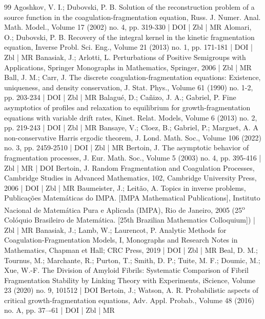 \documentclass[10pt]{amsart}
\theoremstyle{definition}\newtheorem{defi}[theo]{Definition}\newtheorem{rema}[theo]{Remark}\newtheorem{exam}[theo]{Example}\newtheorem{exem}[theo]{Example}\newtheorem{nota}[theo]{Notation}
\begin{document}
\begin{thebibliography}{99}
Agoshkov, V. I.; Dubovski, P. B. Solution of the reconstruction problem of a source function in the coagulation-fragmentation equation, Russ. J. Numer. Anal. Math. Model., Volume 17 (2002) no. 4, pp. 319-330 | DOI | Zbl | MR
Alomari, O.; Dubovski, P. B. Recovery of the integral kernel in the kinetic fragmentation equation, Inverse Probl. Sci. Eng., Volume 21 (2013) no. 1, pp. 171-181 | DOI | Zbl | MR
Banasiak, J.; Arlotti, L. Perturbations of Positive Semigroups with Applications, Springer Monographs in Mathematics, Springer, 2006 | Zbl | MR
Ball, J. M.; Carr, J. The discrete coagulation-fragmentation equations: Existence, uniqueness, and density conservation, J. Stat. Phys., Volume 61 (1990) no. 1-2, pp. 203-234 | DOI | Zbl | MR
Balagué, D.; Cañizo, J. A.; Gabriel, P. Fine asymptotics of profiles and relaxation to equilibrium for growth-fragmentation equations with variable drift rates, Kinet. Relat. Models, Volume 6 (2013) no. 2, pp. 219-243 | DOI | Zbl | MR
Bansaye, V.; Cloez, B.; Gabriel, P.; Marguet, A. A non-conservative Harris ergodic theorem, J. Lond. Math. Soc., Volume 106 (2022) no. 3, pp. 2459-2510 | DOI | Zbl | MR
Bertoin, J. The asymptotic behavior of fragmentation processes, J. Eur. Math. Soc., Volume 5 (2003) no. 4, pp. 395-416 | Zbl | MR | DOI
Bertoin, J. Random Fragmentation and Coagulation Processes, Cambridge Studies in Advanced Mathematics, 102, Cambridge University Press, 2006 | DOI | Zbl | MR
Baumeister, J.; Leitão, A. Topics in inverse problems, Publicações Matemáticas do IMPA. [IMPA Mathematical Publications], Instituto Nacional de Matemática Pura e Aplicada (IMPA), Rio de Janeiro, 2005 (25\textsuperscript{o} Colóquio Brasileiro de Matemática. [25th Brazilian Mathematics Colloquium]) | Zbl | MR
Banasiak, J.; Lamb, W.; Laurencot, P. Analytic Methods for Coagulation-Fragmentation Models, I, Monographs and Research Notes in Mathematics, Chapman et Hall; CRC Press, 2019 | DOI | Zbl | MR
Beal, D. M.; Tournus, M.; Marchante, R.; Purton, T.; Smith, D. P.; Tuite, M. F.; Doumic, M.; Xue, W.-F. The Division of Amyloid Fibrils: Systematic Comparison of Fibril Fragmentation Stability by Linking Theory with Experiments, iScience, Volume 23 (2020) no. 9, 101512 | DOI
Bertoin, J.; Watson, A. R. Probabilistic aspects of critical growth-fragmentation equations, Adv. Appl. Probab., Volume 48 (2016) no. A, pp. 37–-61 | DOI | Zbl | MR

\end{thebibliography}
\end{document}
